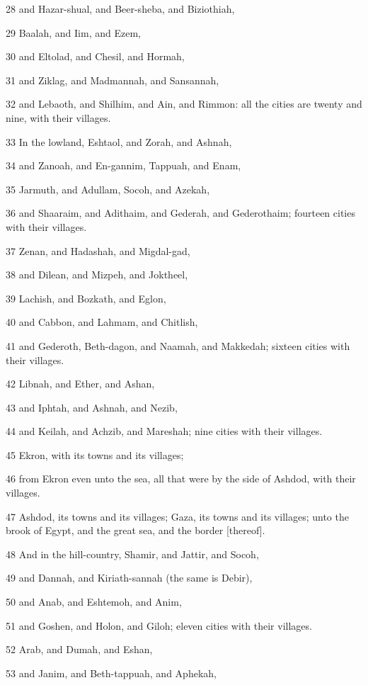\par 28 and Hazar-shual, and Beer-sheba, and Biziothiah,
\par 29 Baalah, and Iim, and Ezem,
\par 30 and Eltolad, and Chesil, and Hormah,
\par 31 and Ziklag, and Madmannah, and Sansannah,
\par 32 and Lebaoth, and Shilhim, and Ain, and Rimmon: all the cities are twenty and nine, with their villages.
\par 33 In the lowland, Eshtaol, and Zorah, and Ashnah,
\par 34 and Zanoah, and En-gannim, Tappuah, and Enam,
\par 35 Jarmuth, and Adullam, Socoh, and Azekah,
\par 36 and Shaaraim, and Adithaim, and Gederah, and Gederothaim; fourteen cities with their villages.
\par 37 Zenan, and Hadashah, and Migdal-gad,
\par 38 and Dilean, and Mizpeh, and Joktheel,
\par 39 Lachish, and Bozkath, and Eglon,
\par 40 and Cabbon, and Lahmam, and Chitlish,
\par 41 and Gederoth, Beth-dagon, and Naamah, and Makkedah; sixteen cities with their villages.
\par 42 Libnah, and Ether, and Ashan,
\par 43 and Iphtah, and Ashnah, and Nezib,
\par 44 and Keilah, and Achzib, and Mareshah; nine cities with their villages.
\par 45 Ekron, with its towns and its villages;
\par 46 from Ekron even unto the sea, all that were by the side of Ashdod, with their villages.
\par 47 Ashdod, its towns and its villages; Gaza, its towns and its villages; unto the brook of Egypt, and the great sea, and the border [thereof].
\par 48 And in the hill-country, Shamir, and Jattir, and Socoh,
\par 49 and Dannah, and Kiriath-sannah (the same is Debir),
\par 50 and Anab, and Eshtemoh, and Anim,
\par 51 and Goshen, and Holon, and Giloh; eleven cities with their villages.
\par 52 Arab, and Dumah, and Eshan,
\par 53 and Janim, and Beth-tappuah, and Aphekah,
